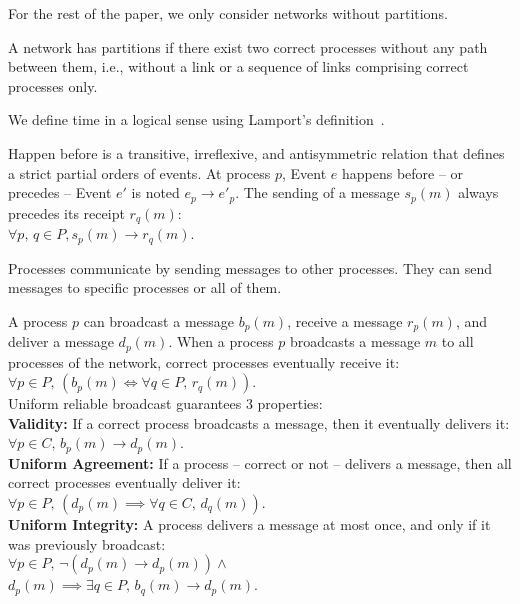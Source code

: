 For the rest of the paper, we only consider networks without partitions.

\begin{definition}
  A network has partitions if there exist two correct processes without any path
  between them, i.e., without a link or a sequence of links comprising correct
  processes only.
\end{definition}


We define time in a logical sense using Lamport's
definition~\cite{lamport1978time}.

\begin{definition}
  Happen before is a transitive, irreflexive, and antisymmetric relation that
  defines a strict partial orders of events. At process $p$, Event $e$ happens
  before -- or precedes -- Event $e'$ is noted $e_p \rightarrow e'_p$. The
  sending of a message $s_p(m)$ always precedes its receipt $r_q(m)$: \\
  $\forall p,\,q \in P, s_p(m) \rightarrow r_q(m)$.
\end{definition}

Processes communicate by sending messages to other processes. They can send
messages to specific processes or all of them.

\begin{definition}
  A process $p$ can broadcast a message $b_p(m)$, receive a message $r_p(m)$,
  and deliver a message $d_p(m)$.  When a process $p$ broadcasts a message $m$
  to all processes of the network, correct processes eventually receive it: 
  $\forall p \in P,\, (b_p(m) \Leftrightarrow \forall q \in P,\, r_q(m))$. \\
  Uniform reliable broadcast guarantees 3 properties: \\
  \textbf{Validity:} If a correct process broadcasts a message, then it
  eventually
  delivers it: $\forall p \in C,\, b_p(m) \rightarrow d_p(m)$. \\
  \textbf{Uniform Agreement:} If a process -- correct or not -- delivers a
  message,
  then all correct processes eventually deliver it:\\
  $\forall p \in P,\, (d_p(m) \implies \forall q \in C,\, d_q(m))$. \\
  \textbf{Uniform Integrity:} A process delivers a message at most once, and
  only if it was previously broadcast:\\
  $\forall p \in P,\, \neg(d_p(m) \rightarrow d_p(m)) \wedge$\\$d_p(m) \implies
  \exists q \in P,\, b_q(m) \rightarrow d_p(m)$.
\end{definition}

